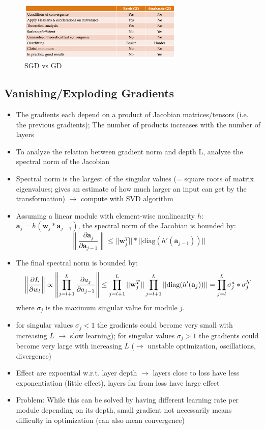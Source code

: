 \begin{figure}[ht!]
	\centering
	\includegraphics[width=0.7\textwidth]{figures/SGDvsGD.png}
	\caption{SGD vs GD}
	\label{fig:SGDvsGD}
\end{figure}
\subsection{Vanishing/Exploding Gradients}
\begin{itemize}
	\item The gradients each depend on a product of Jacobian matrices/tensors (i.e. the previous gradients); The number of products increases with the number of layers
	\item To analyze the relation between gradient norm and depth L, analyze the spectral norm of the Jacobian
	\item Spectral norm is the largest of the singular values (= square roots of matrix eigenvalues; gives an estimate of how much larger an input can get by the transformation) $\rightarrow$ compute with SVD algorithm
	\item Assuming a linear module with element-wise nonlinearity $h$: $\mathbf{a}_j = h(\mathbf{w}_j * \mathbf{a}_{j-1})$, the spectral norm of the Jacobian is bounded by: $$\left\| \dfrac{\partial \mathbf{a}_j}{\partial \mathbf{a}_{j-1}} \right\| \leq ||\mathbf{w}_j^T || * ||\mathrm{diag}(h'(\mathbf{a}_{j-1}))||$$
	\item The final spectral norm is bounded by:
		$$
		\left\| \dfrac{\partial L}{\partial w_l} \right\| \propto \left\| \prod_{j=l+1}^{L} \dfrac{\partial a_j}{\partial a_{j-1}} \right\| \leq \prod_{j=l+1}^{L} || \mathbf{w}_j^T|| \prod_{j=l+1}^{L} ||\mathrm{diag}(h'(\mathbf{a}_j))|| \\ = \prod_{j=l}^{L} \sigma_j^a * \sigma_j^{h'}$$ 
	where $\sigma_j$ is the maximum singular value for module $j$.
	\item for singular values $\sigma_j < 1$ the gradients could become very small with increasing $L$ $\rightarrow$ slow learning); for singular values $\sigma_j > 1$ the gradients could become very large with increasing $L$ ($\rightarrow$ unstable optimization, oscillations, divergence)
	\item Effect are expoential w.r.t. layer depth $\rightarrow$ layers close to loss have less exponentiation (little effect), layers far from loss have large effect
	\item Problem: While this can be solved by having different learning rate per module depending on its depth, small gradient not necessarily means difficulty in optimization (can also mean convergence)
\end{itemize}
